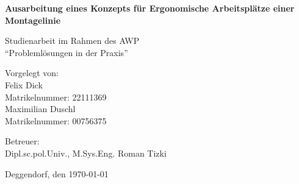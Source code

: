 \documentclass[12pt, a4paper]{article}
\begin{document}

\begin{titlepage}
    \centering
    
    
    \vspace{2cm}
    
    {\Huge\bfseries Ausarbeitung eines Konzepts für Ergonomische Arbeitsplätze einer Montagelinie\par}
    
    \vspace{1cm}
    
    {\Large Studienarbeit im Rahmen des AWP \\
    \enquote{Problemlösungen in der Praxis}\par}
    
    \vspace{2cm}
    
    {\large
    Vorgelegt von: \\
    \vspace{0.2cm}
    Felix Dick \\ 
    Matrikelnummer: 22111369\\ 
    Maximilian Duschl \\ 
    Matrikelnummer: 00756375\\
    \vspace{1.5cm}
    
    Betreuer: \\
    Dipl.sc.pol.Univ., M.Sys.Eng. Roman Tizki \par} %
    
    \vfill %
    
    {\large Deggendorf, den \today\par}

\end{titlepage}



\thispagestyle{empty}

\newpage

\tableofcontents
\newpage










\newpage
\printbibliography[title={References}]
\end{document}
